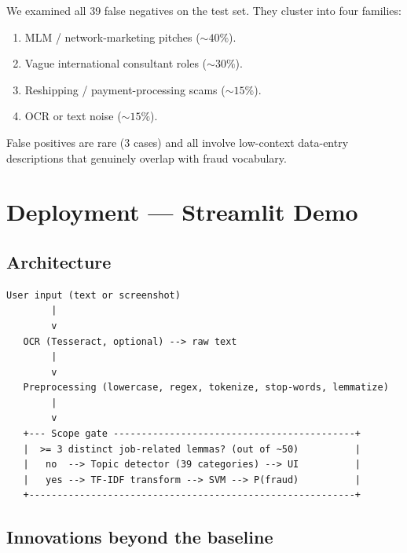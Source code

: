 \documentclass[11pt,a4paper]{article}
\begin{document}
We examined all 39 false negatives on the test set. They cluster into four
families:

\begin{enumerate}
    \item MLM / network-marketing pitches (${\sim}40\%$).
    \item Vague international consultant roles (${\sim}30\%$).
    \item Reshipping / payment-processing scams (${\sim}15\%$).
    \item OCR or text noise (${\sim}15\%$).
\end{enumerate}

False positives are rare (3 cases) and all involve low-context data-entry
descriptions that genuinely overlap with fraud vocabulary.

\section{Deployment --- Streamlit Demo}

\subsection{Architecture}

\begin{lstlisting}[basicstyle=\ttfamily\footnotesize,language={}]
User input (text or screenshot)
        |
        v
   OCR (Tesseract, optional) --> raw text
        |
        v
   Preprocessing (lowercase, regex, tokenize, stop-words, lemmatize)
        |
        v
   +--- Scope gate -------------------------------------------+
   |  >= 3 distinct job-related lemmas? (out of ~50)          |
   |   no  --> Topic detector (39 categories) --> UI          |
   |   yes --> TF-IDF transform --> SVM --> P(fraud)          |
   +----------------------------------------------------------+
\end{lstlisting}

\subsection{Innovations beyond the baseline}
\end{document}
